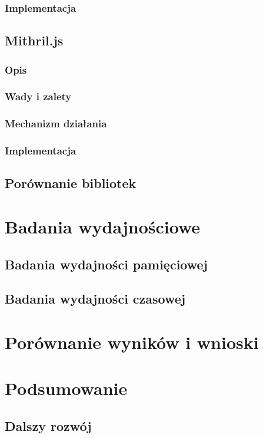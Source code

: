 \documentclass[polish, twoside, 12pt]{mwart}
\let\stdsection\section
\renewcommand*{\section}{\clearpage\stdsection}
\begin{document}
\subsubsection{Implementacja}

\subsection{Mithril.js}

\subsubsection{Opis}

\subsubsection{Wady i zalety}

\subsubsection{Mechanizm działania}

\subsubsection{Implementacja}

\subsection{Porównanie bibliotek}

\section{Badania wydajnościowe}

\subsection{Badania wydajności pamięciowej}

\subsection{Badania wydajności czasowej}

\section{Porównanie wyników i wnioski}

\section{Podsumowanie}

\subsection{Dalszy rozwój}
\end{document}

